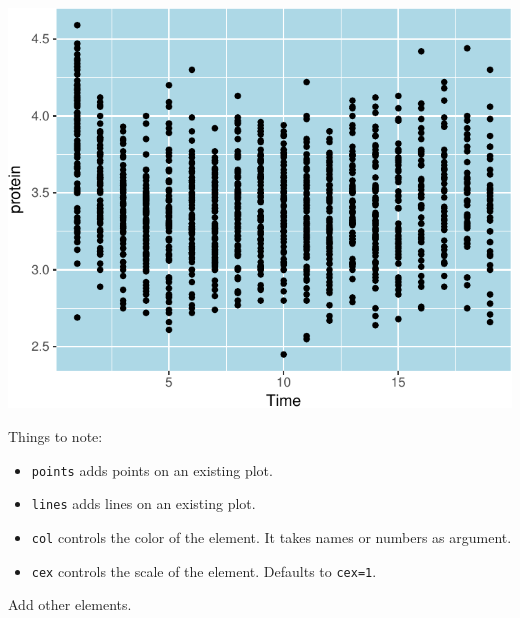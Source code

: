 \documentclass[]{book}
\providecommand{\tightlist}{%
  \setlength{\itemsep}{0pt}\setlength{\parskip}{0pt}}
\theoremstyle{definition}
\theoremstyle{definition}
\theoremstyle{definition}
\theoremstyle{remark}
\begin{document}
\includegraphics[width=0.5\linewidth]{Rcourse_files/figure-latex/unnamed-chunk-247-1}

Things to note:

\begin{itemize}
\tightlist
\item
  \texttt{points} adds points on an existing plot.
\item
  \texttt{lines} adds lines on an existing plot.
\item
  \texttt{col} controls the color of the element. It takes names or
  numbers as argument.
\item
  \texttt{cex} controls the scale of the element. Defaults to
  \texttt{cex=1}.
\end{itemize}

Add other elements.
\end{document}

